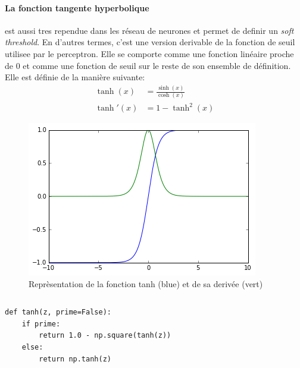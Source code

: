 \documentclass[11pt]{article}
\begin{document}
\paragraph{La fonction tangente hyperbolique} est aussi tres rependue dans les
r\'eseau de neurones et permet de definir un {\em soft threshold}. En d'autres termes,
c'est une version derivable de la fonction de seuil utilisee par le perceptron.
Elle se comporte comme une fonction lin\'eaire proche de 0 et comme une fonction
de seuil sur le reste de son ensemble de d\'efinition.
Elle est d\'efinie de la mani\`ere suivante:
\begin{equation}
	\begin{aligned}
		\tanh(x)  &= \frac{\sinh(x)}{\cosh(x)} \\
		\tanh'(x) &= 1-\tanh^2(x)
	\end{aligned}
\end{equation}
\begin{figure}[htp]
	\centering
	\includegraphics[scale=.5]{img/act_tanh.png}
	\caption{Repr\`esentation de la fonction tanh (blue) et de sa deriv\'ee (vert)}
\end{figure}
\begin{equation}
\end{equation}

\begin{lstlisting}
def tanh(z, prime=False):
    if prime:
		return 1.0 - np.square(tanh(z))
	else:
		return np.tanh(z)
\end{lstlisting}

\newpage
\end{document}
